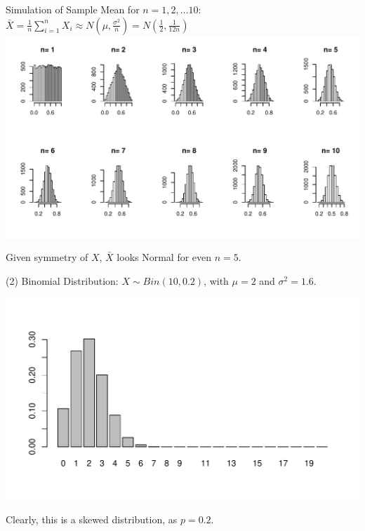 \documentclass[t,xcolor=pdftex,dvipsnames,table]{beamer}\usepackage[]{graphicx}\usepackage[]{color}
\makeatletter
\def\maxwidth{ %
  \ifdim\Gin@nat@width>\linewidth
    \linewidth
  \else
    \Gin@nat@width
  \fi
}
\newenvironment{knitrout}{}{} %
\makeatother
\begin{document}
\begin{frame}{}

Simulation of Sample Mean for $n=1,2,\ldots 10$: $\bar{X} = \frac{1}{n} \sum_{i=1}^{n} X_{i}  \approx N(\mu, \frac{\sigma^2}{n}) = N(\frac{1}{2},\frac{1}{12n})$  \\


\begin{knitrout}
\color{fgcolor}
\includegraphics[width=\maxwidth]{figure/unnamed-chunk-112-1} 

\end{knitrout}
Given symmetry of $X$, $\bar{X}$ looks Normal for even $n=5$.
\end{frame}

\begin{frame}{}

(2) Binomial Distribution: $X \sim Bin(10,0.2)$, with
$\mu = 2$ and $\sigma^2 = 1.6$.


\begin{knitrout}
\color{fgcolor}
\includegraphics[width=\maxwidth]{figure/unnamed-chunk-113-1} 

\end{knitrout}

Clearly, this is a skewed distribution, as $p=0.2$.
\end{frame}
\end{document}

